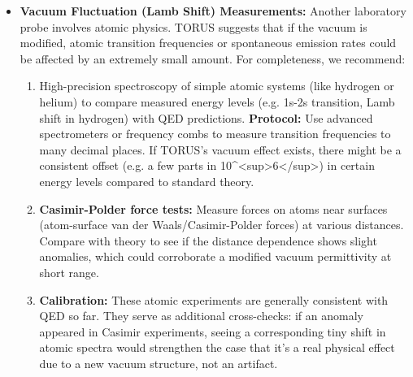 \documentclass[]{article}
\begin{document}
{\begin{itemize}
\begin{enumerate}
    a reproducible deviation is measured -- e.g. an extra force
    component or distance-dependent anomaly at the \$10\^{}\{-5\}\$
    level or lower -- and cannot be explained by experimental error or
    standard physics, it would be strong evidence that the vacuum is
    ``structured'' by the TORUS recursion (essentially revealing a new
    tiny component in the vacuum energy)​. Even a slight discrepancy
    would be groundbreaking: it would indicate an incomplete
    understanding of vacuum physics and hint at TORUS's
    higher-dimensional influence emerging in precise QED tests.
  \end{enumerate}
\item
  \textbf{Vacuum Fluctuation (Lamb Shift) Measurements:} Another
  laboratory probe involves atomic physics. TORUS suggests that if the
  vacuum is modified, atomic transition frequencies or spontaneous
  emission rates could be affected by an extremely small amount​. For
  completeness, we recommend:

  \begin{enumerate}
  \def\labelenumi{\arabic{enumi}.}
  \item
    High-precision spectroscopy of simple atomic systems (like hydrogen
    or helium) to compare measured energy levels (e.g. 1s-2s transition,
    Lamb shift in hydrogen) with QED predictions. \textbf{Protocol:} Use
    advanced spectrometers or frequency combs to measure transition
    frequencies to many decimal places. If TORUS's vacuum effect exists,
    there might be a consistent offset (e.g. a few parts in
    10\^{}\textless{}sup\textgreater{}6\textless{}/sup\textgreater{}) in
    certain energy levels compared to standard theory​.
  \item
    \textbf{Casimir-Polder force tests:} Measure forces on atoms near
    surfaces (atom-surface van der Waals/Casimir-Polder forces) at
    various distances. Compare with theory to see if the distance
    dependence shows slight anomalies, which could corroborate a
    modified vacuum permittivity at short range.
  \item
    \textbf{Calibration:} These atomic experiments are generally
    consistent with QED so far. They serve as additional cross-checks:
    if an anomaly appeared in Casimir experiments, seeing a
    corresponding tiny shift in atomic spectra would strengthen the case
    that it's a real physical effect due to a new vacuum structure, not
    an artifact.
  \end{enumerate}
\end{itemize}

}
\end{document}
